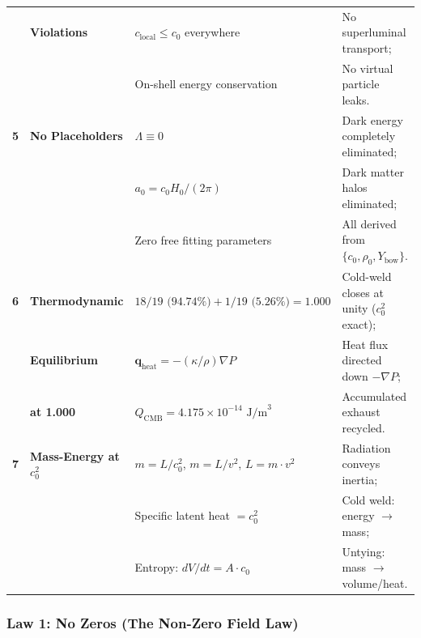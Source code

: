 \documentclass[11pt,a4paper]{article}
\begin{document}
\begin{table}[!htbp]
\begin{tabularx}{\textwidth}{C{0.6cm} L{2.8cm} L{5.2cm} Y}
& \textbf{Violations} & $c_{\text{local}} \le c_0$ everywhere & No superluminal transport; \\
& & On-shell energy conservation & No virtual particle leaks. \\
\midrule
\textbf{5} & \textbf{No Placeholders} & $\Lambda \equiv 0$ & Dark energy completely eliminated; \\
& & $a_0 = c_0 H_0 / (2\pi)$ & Dark matter halos eliminated; \\
& & Zero free fitting parameters & All derived from $\{c_0, \rho_0, Y_{\text{bow}}\}$. \\
\midrule
\textbf{6} & \textbf{Thermodynamic} & $18/19\text{ (94.74\%)} + 1/19\text{ (5.26\%)} = 1.000$ & Cold-weld closes at unity ($c_0^2$ exact); \\
& \textbf{Equilibrium} & $\mathbf{q}_{\text{heat}} = -(\kappa/\rho)\nabla P$ & Heat flux directed down $-\nabla P$; \\
& \textbf{at 1.000} & $Q_{\text{CMB}} = 4.175 \times 10^{-14}\text{ J/m}^3$ & Accumulated exhaust recycled. \\
\midrule
\textbf{7} & \textbf{Mass-Energy at $c_0^2$} & $m = L / c_0^2$, $m = L / v^2$, $L = m \cdot v^2$ & Radiation conveys inertia; \\
& & Specific latent heat $= c_0^2$ & Cold weld: energy $\to$ mass; \\
& & Entropy: $dV/dt = A \cdot c_0$ & Untying: mass $\to$ volume/heat. \\
\bottomrule
\end{tabularx}
\end{table}

\subsubsection{Law 1: No Zeros (The Non-Zero Field Law)}
\label{subsubsec:law_1_no_zeros}
\end{document}
